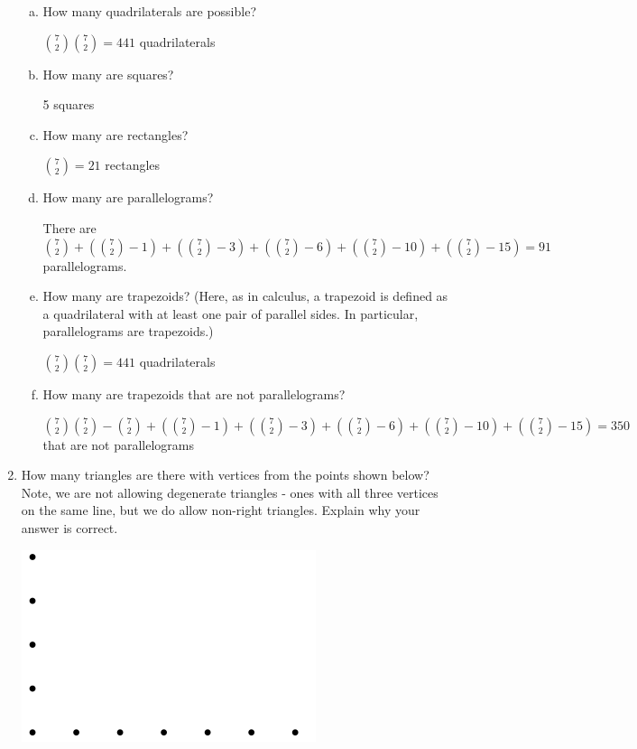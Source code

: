 \documentclass[11pt, a4paper]{article}
\begin{document}
\begin{enumerate}
            \begin{enumerate}[(a)]
                \item How many quadrilaterals are possible?

                ${7\choose 2}{7\choose 2} = 441$ quadrilaterals

                \item How many are squares?

                5 squares

                \item How many are rectangles?

                ${7\choose 2} = 21$ rectangles

                \item How many are parallelograms?

                There are ${7\choose 2} + ({7\choose 2} - 1) + ({7\choose 2} - 3) + ({7\choose 2} - 6) + ({7\choose 2} - 10) + ({7\choose 2} - 15) = 91$ parallelograms.

                \item How many are trapezoids? (Here, as in calculus, a trapezoid is defined as a quadrilateral with at least one pair of parallel sides. In particular, parallelograms are trapezoids.)

                ${7\choose 2}{7\choose 2} = 441$ quadrilaterals

                \item How many are trapezoids that are not parallelograms?


${7\choose 2}{7\choose 2} - {7 \choose 2} + ({7 \choose 2}-1) + ({7 \choose 2} - 3) + ({7 \choose 2} - 6) + ({7 \choose 2} - 10) + ({7 \choose 2} - 15) = 350$ that are not parallelograms

            \end{enumerate}

        \item How many triangles are there with vertices from the points shown below? Note, we are not allowing degenerate triangles - ones with all three vertices on the same line, but we do allow non-right triangles. Explain why your answer is correct.

            \begin{center}
            \includegraphics[width=.5\textwidth]{hw4_graphic2}
            \end{center}


\end{enumerate}
\end{document}

